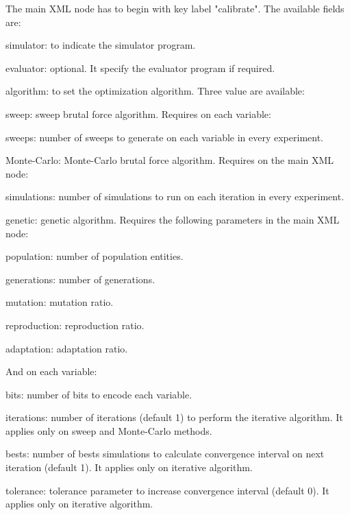 \documentclass[review,authoryear]{elsarticle}
\begin{document}
The main XML node has to begin with key label "calibrate". The available fields
are:
\begin{description}
\item{simulator}: to indicate the simulator program.
\item{evaluator}: optional. It specify the evaluator program if required.
\item{algorithm}: to set the optimization algorithm. Three value are available:
	\begin{description}
	\item{sweep}: sweep brutal force algorithm. Requires on each variable:
		\begin{description}
		\item{sweeps}: number of sweeps to generate on each variable in every
			experiment.
		\end{description}
	\item{Monte-Carlo}: Monte-Carlo brutal force algorithm. Requires on the main
		XML node:
		\begin{description}
		\item{simulations}: number of simulations to run on each iteration in
			every experiment.
		\end{description}
	\item{genetic}: genetic algorithm. Requires the following parameters in the
		main XML node:
		\begin{description}
		\item{population}: number of population entities.
		\item{generations}: number of generations.
		\item{mutation}: mutation ratio.
		\item{reproduction}: reproduction ratio.
		\item{adaptation}: adaptation ratio.
		\end{description}
	And on each variable:
		\begin{description}
		\item{bits}: number of bits to encode each variable.
		\end{description}
	\end{description}
\item{iterations}: number of iterations (default 1) to perform the iterative
algorithm. It applies only on sweep and Monte-Carlo methods.
\item{bests}: number of bests simulations to calculate convergence interval on
next iteration (default 1). It applies only on iterative algorithm.
\item{tolerance}: tolerance parameter to increase convergence interval (default
0). It applies only on iterative algorithm.
\end{description}
\end{document}
